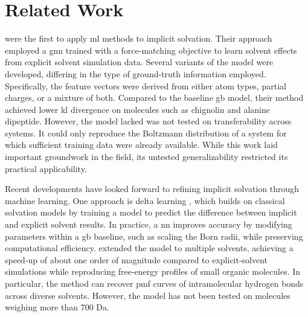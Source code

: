 \section{Related Work}
\label{sec:related_work}

\citet{machine_learning_implicit_solvation} were the first to apply \gls{ml} methods to implicit solvation. Their approach employed a \gls{gnn} trained with a force-matching objective to learn solvent effects from explicit solvent simulation data. Several variants of the model were developed, differing in the type of ground-truth information employed. Specifically, the feature vectors were derived from either atom types, partial charges, or a mixture of both. Compared to the baseline \gls{gb} model, their method achieved lower \gls{kl} divergence on molecules such as chignolin and alanine dipeptide. However, the model lacked was not tested on transferability across systems. It could only reproduce the Boltzmann distribution of a system for which sufficient training data were already available. While this work laid important groundwork in the field, its untested generalizability restricted its practical applicability.

Recent developments have looked forward to refining implicit solvation through machine learning. One approach is delta learning \cite{katzberger2024general, katzberger2025rapid}, which builds on classical solvation models by training a model to predict the difference between implicit and explicit solvent results. In practice, a \gls{nn} improves accuracy by modifying parameters within a \gls{gb} baseline, such as scaling the Born radii, while preserving computational efficiency. \citet{katzberger2024general} extended the model to multiple solvents, achieving a speed-up of about one order of magnitude compared to explicit-solvent simulations while reproducing free-energy profiles of small organic molecules. In particular, the method can recover \gls{pmf} curves of intramolecular hydrogen bonds across diverse solvents. However, the model has not been tested on molecules weighing more than 700 Da.

